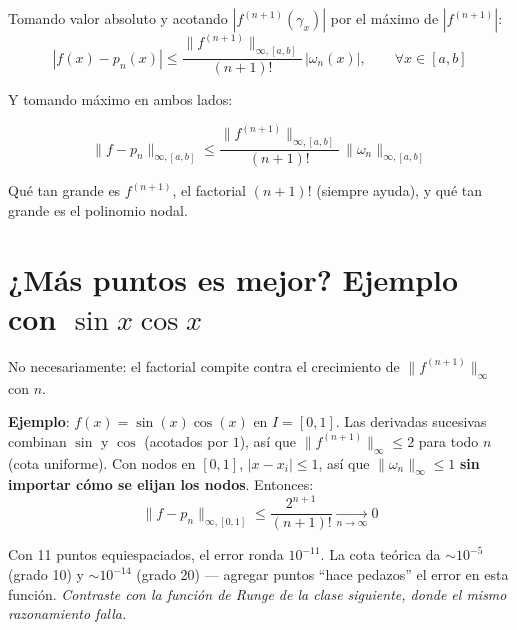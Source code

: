 \documentclass[12pt,a4paper]{article}
\begin{document}
Tomando valor absoluto y acotando $|f^{(n+1)}(\gamma_x)|$ por el máximo de
$|f^{(n+1)}|$:
$$|f(x)-p_n(x)| \leq \frac{\|f^{(n+1)}\|_{\infty,[a,b]}}{(n+1)!}\,|\omega_n(x)|, \qquad \forall x\in[a,b]$$

Y tomando máximo en ambos lados:

\begin{keybox}
$$\|f-p_n\|_{\infty,[a,b]} \leq \frac{\|f^{(n+1)}\|_{\infty,[a,b]}}{(n+1)!}\,\|\omega_n\|_{\infty,[a,b]}$$
\end{keybox}

\begin{notebox}
Qué tan grande es $f^{(n+1)}$, el factorial $(n+1)!$ (siempre ayuda), y qué
tan grande es el polinomio nodal.
\end{notebox}

\section{¿Más puntos es mejor? Ejemplo con \texorpdfstring{$\sin x\cos x$}{sin(x)cos(x)}}

No necesariamente: el factorial compite contra el crecimiento de
$\|f^{(n+1)}\|_\infty$ con $n$.

\textbf{Ejemplo}: $f(x)=\sin(x)\cos(x)$ en $I=[0,1]$. Las derivadas
sucesivas combinan $\sin$ y $\cos$ (acotados por $1$), así que
$\|f^{(n+1)}\|_\infty \leq 2$ para todo $n$ (cota uniforme). Con nodos en
$[0,1]$, $|x-x_i|\leq 1$, así que $\|\omega_n\|_\infty \leq 1$
\textbf{sin importar cómo se elijan los nodos}. Entonces:
$$\|f-p_n\|_{\infty,[0,1]} \leq \frac{2^{n+1}}{(n+1)!} \xrightarrow[n\to\infty]{} 0$$

\begin{notebox}
Con 11 puntos equiespaciados, el error ronda $10^{-11}$. La cota teórica da
$\sim 10^{-5}$ (grado 10) y $\sim 10^{-14}$ (grado 20) — agregar puntos
``hace pedazos'' el error en esta función. \emph{Contraste con la función
de Runge de la clase siguiente, donde el mismo razonamiento falla.}
\end{notebox}
\end{document}
